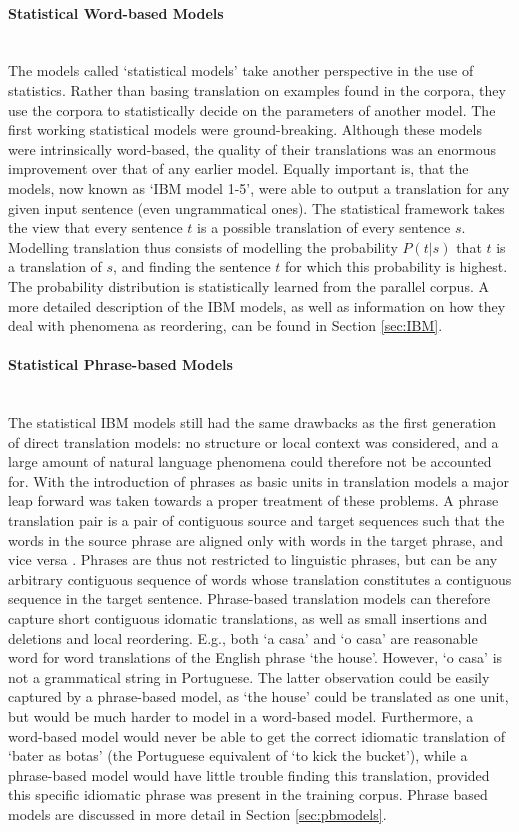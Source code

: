 \documentclass{report}
\newcommand{\myparagraph}[1]{\paragraph{#1}\mbox{}\\}
\theoremstyle{definition}
\theoremstyle{plain}
\begin{document}
\myparagraph{Statistical Word-based Models}
The models called `statistical models' take another perspective in the use of statistics. Rather than basing translation on examples found in the corpora, they use the corpora to statistically decide on the parameters of another model. The first working statistical models \citep{brown1988statistical,brown1990statistical,brown1993mathematics} were ground-breaking. Although these models were intrinsically word-based, the quality of their translations was an enormous improvement over that of any earlier model. Equally important is, that the models, now known as `IBM model 1-5', were able to output a translation for any given input sentence (even ungrammatical ones). The statistical framework takes the view that every sentence $t$ is a possible translation of every sentence $s$. Modelling translation thus consists of modelling the probability $P(t|s)$ that $t$ is a translation of $s$, and finding the sentence $t$ for which this probability is highest. The probability distribution is statistically learned from the parallel corpus. A more detailed description of the IBM models, as well as information on how they deal with phenomena as reordering, can be found in Section \ref{sec:IBM}.

\myparagraph{Statistical Phrase-based Models}
The statistical IBM models still had the same drawbacks as the first generation of direct translation models: no structure or local context was considered, and a large amount of natural language phenomena could therefore not be accounted for. With the introduction of phrases as basic units in translation models \citep{wang1998grammar,och1999improved} a major leap forward was taken towards a proper treatment of these problems. A phrase translation pair is a pair of contiguous source and target sequences such that the words in the source phrase are aligned only with words in the target phrase, and vice versa \citep{och2000improved}. Phrases are thus not restricted to linguistic phrases, but can be any arbitrary contiguous sequence of words whose translation constitutes a contiguous sequence in the target sentence. Phrase-based translation models can therefore capture short contiguous idomatic translations, as well as small insertions and deletions and local reordering. E.g., both `a casa' and `o casa' are reasonable word for word translations of the English phrase `the house'. However, `o casa' is not a grammatical string in Portuguese. The latter observation could be easily captured by a phrase-based model, as `the house' could be translated as one unit, but would be much harder to model in a word-based model. Furthermore, a word-based model would never be able to get the correct idiomatic translation of `bater as botas' (the Portuguese equivalent of `to kick the bucket'), while a phrase-based model would have little trouble finding this translation, provided this specific idiomatic phrase was present in the training corpus. Phrase based models are discussed in more detail in Section \ref{sec:pbmodels}.
\end{document}
